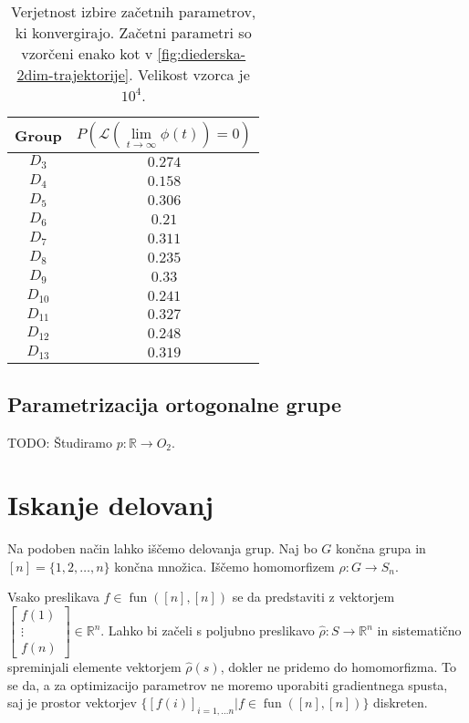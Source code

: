 \documentclass[mat2, tisk]{fmfdelo}
\newcommand{\TODO}[1]{{\color{blue} TODO: #1}}
\newcommand{\R}{\mathbb R}
\newcommand{\loss }{\mathcal L}
\newcommand{\fun}{\operatorname{fun}}
\newcommand{\funnn}[1]{\fun([#1], [#1])}
\begin{document}
        \begin{table}[ht]
    \centering
    \begin{tabular}{c|c}
         Group &  $P\left( \loss (\lim \limits_{t \to \infty}\phi(t)) = 0  \right)$\\
         \hline
$D_{3}$ & $0.274$\\
$D_{4}$ & $0.158$\\
$D_{5}$ & $0.306$\\
$D_{6}$ & $0.21$\\
$D_{7}$ & $0.311$\\
$D_{8}$ & $0.235$\\
$D_{9}$ & $0.33$\\
$D_{10}$ & $0.241$\\
$D_{11}$ & $0.327$\\
$D_{12}$ & $0.248$\\
$D_{13}$ & $0.319$
    \end{tabular}
    \caption{Verjetnost izbire začetnih parametrov, ki konvergirajo. Začetni parametri so vzorčeni enako kot v \ref{fig:diederska-2dim-trajektorije}. Velikost vzorca je $10^4$.}
    \label{tab:verjetnost-konvergence-diederska-2dim}
\end{table}
        \subsection{Parametrizacija ortogonalne grupe}
        \TODO{Študiramo $p \colon \R \to O_2$}.
\clearpage%
\section{Iskanje delovanj}
Na podoben način lahko iščemo delovanja grup. Naj bo $G$ končna grupa in $[n] =    \{1,2,\dotsc, n\}$ končna množica. Iščemo homomorfizem $\rho \colon G \to S_n$.

Vsako preslikava $f \in \funnn{n}$ se da predstaviti z vektorjem $\begin{bmatrix}
    f(1)\\
    \vdots \\
    f(n)
\end{bmatrix} \in \R^n$. Lahko bi začeli s poljubno preslikavo $\hat \rho \colon S \to \R^n$ in sistematično spreminjali elemente vektorjem $\hat\rho(s)$, dokler ne pridemo do homomorfizma. To se da, a za optimizacijo parametrov ne moremo uporabiti gradientnega spusta, saj je prostor vektorjev $\{[f(i)]_{i=1, \dotsc n} | f \in \funnn{n}\}$ diskreten. 
\end{document}
